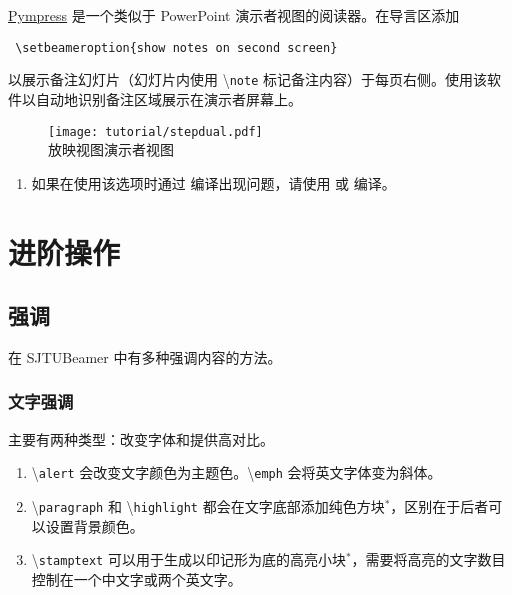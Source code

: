 \documentclass[
    UTF8,
    heading=true,
    12pt,
    a4paper
]{ctexrep}
\newenvironment{commentlist}{\begin{enumerate}\small}{\end{enumerate}}
\newcommand{\cmd}[1]{\textbackslash{}\texttt{#1}}
\def\themename{\textsf{SJTUBeamer}}
\begin{document}
\href{https://github.com/Cimbali/pympress}{Pympress} 是一个类似于 PowerPoint
演示者视图的阅读器。在导言区添加
\begin{verbatim}
 \setbeameroption{show notes on second screen}
\end{verbatim}
以展示备注幻灯片（幻灯片内使用 \cmd{note} 标记备注内容）于每页右侧。使用该软件以自动地识别备注区域展示在演示者屏幕上。


\begin{figure}[h]
  \centering
  \texttt{[image: tutorial/stepdual.pdf]}\\
  放映视图\hspace{6em}演示者视图
\end{figure}

\begin{commentlist}
  \item 如果在使用该选项时通过  编译出现问题，请使用  或  编译。
\end{commentlist}


\part{进阶操作}

\chapter{强调}

在 \themename{} 中有多种强调内容的方法。

\section{文字强调}

主要有两种类型：改变字体和提供高对比。


\begin{commentlist}
  \item \cmd{alert} 会改变文字颜色为主题色。\cmd{emph} 会将英文字体变为斜体。
  \item \cmd{paragraph} 和 \cmd{highlight} 都会在文字底部添加纯色方块$^*$，区别在于后者可以设置背景颜色。
  \item \cmd{stamptext} 可以用于生成以印记形为底的高亮小块$^*$，需要将高亮的文字数目控制在一个中文字或两个英文字。
\end{commentlist}
\end{document}
